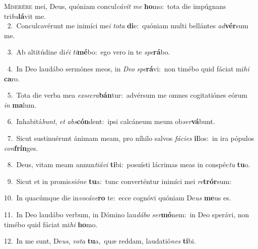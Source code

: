 \lettrine{\initial\textcolor{\initialcolor}{M}}{iserére} mei, Deus, quóniam concul\-\textit{cá}\-\textit{vit} \textit{me} \textbf{ho}\-mo:~\star tota die impúgnans tri\-\textit{bu}\-\textbf{lá}vit me.\\
{\numbfont\textcolor{\numbcolor}{~2.}}~Conculcavérunt me inimíci me\textit{i} \textit{to}\-\textit{ta} \textbf{di}\-e:~\star quóniam multi bellántes \textit{ad}\-\textbf{vér}sum me.\par
{\numbfont\textcolor{\numbcolor}{~3.}}~Ab altitúdine di\-\textit{é}\-\textit{i} \textit{ti}\-\textbf{mé}bo:~\star ego vero in te \textit{spe}\-\textbf{rá}bo.\par
{\numbfont\textcolor{\numbcolor}{~4.}}~In Deo laudábo sermónes meos, in \textit{De}\-\textit{o} \textit{spe}\-\textbf{rá}vi:~\star non timébo quid fáciat mi\textit{hi} \textbf{ca}\-ro.\par
{\numbfont\textcolor{\numbcolor}{~5.}}~Tota die verba mea \textit{ex}\-\textit{se}\textit{cra}\textbf{bán}tur:~\star advérsum me omnes cogitatiónes eórum \textit{in} \textbf{ma}\-lum.\par
{\numbfont\textcolor{\numbcolor}{~6.}}~Inhabitá\-\textit{bunt}\-, \textit{et} \textit{abs}\-\textbf{cón}dent:~\star ipsi calcáneum meum ob\-\textit{ser}\-\textbf{vá}bunt.\par
{\numbfont\textcolor{\numbcolor}{~7.}}~Sicut sustinuérunt ánimam meam, pro níhilo salvos \textit{fá}\-\textit{ci}\textit{es} \textbf{il}\-los:~\star in ira pópulos \textit{con}\-\textbf{frín}ges.\par
{\numbfont\textcolor{\numbcolor}{~8.}}~Deus, vitam meam annun\-\textit{ti}\-\textit{á}\textit{vi} \textbf{ti}\-bi:~\star posuísti lácrimas meas in conspéc\textit{tu} \textbf{tu}\-o.\par
{\numbfont\textcolor{\numbcolor}{~9.}}~Sicut et in promis\-\textit{si}\-\textit{ó}\textit{ne} \textbf{tu}\-a:~\star tunc converténtur inimíci mei \textit{re}\-\textbf{trór}sum:\par
{\numbfont\textcolor{\numbcolor}{10.}}~In quacúmque die in\-\textit{vo}\-\textit{cá}\textit{ve}\textbf{ro} te:~\star ecce cognóvi quóniam De\textit{us} \textbf{me}\-us es.\par
{\numbfont\textcolor{\numbcolor}{11.}}~In Deo laudábo verbum, in Dómino lau\-\textit{dá}\-\textit{bo} \textit{ser}\-\textbf{mó}nem:~\star in Deo sperávi, non timébo quid fáciat mi\textit{hi} \textbf{ho}\-mo.\par
{\numbfont\textcolor{\numbcolor}{12.}}~In me sunt, De\-\textit{us}\-, \textit{vo}\-\textit{ta} \textbf{tu}\-a,~\star quæ reddam, laudatió\textit{nes} \textbf{ti}\-bi.\par
